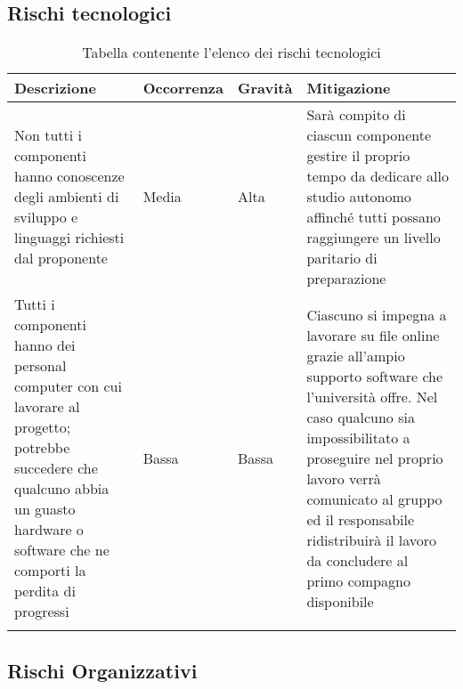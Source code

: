 \documentclass[../piano_di_progetto.tex]{subfiles}
\begin{document}
\subsection{Rischi tecnologici}%
\label{sub:rischi_tec}

\begin{center}
	\begin{longtable}{| p{3.5cm} | p{2cm}|p{2cm}|p{3.5cm}|}
		\hline
		\rowcolor{lightgray}
		{\textbf{Descrizione}} & {\textbf{Occorrenza}} & {\textbf{Gravità}} & {\textbf{Mitigazione}} \\

		\hline
			Non tutti i componenti hanno conoscenze degli ambienti di sviluppo e linguaggi richiesti dal proponente

			&
			Media
			& 
			Alta
			&
			Sarà compito di ciascun componente gestire il proprio tempo da dedicare allo studio autonomo affinché tutti possano raggiungere un livello paritario di preparazione 
\\			
			\hline
			Tutti i componenti hanno dei personal computer con cui lavorare al progetto; potrebbe succedere che qualcuno abbia un guasto hardware o software che ne comporti la perdita di progressi

			&
			Bassa
			& 
			Bassa
			& 
			Ciascuno si impegna a lavorare su file online grazie all’ampio supporto software che l’università offre. Nel caso qualcuno sia impossibilitato a proseguire nel proprio lavoro verrà comunicato al gruppo ed il responsabile ridistribuirà il lavoro da concludere al primo compagno disponibile\\
			\hline
\caption{Tabella contenente l'elenco dei rischi tecnologici}
	\end{longtable}

\end{center}

\subsection{Rischi Organizzativi}%
\label{sub:rischi_org}
\end{document}
